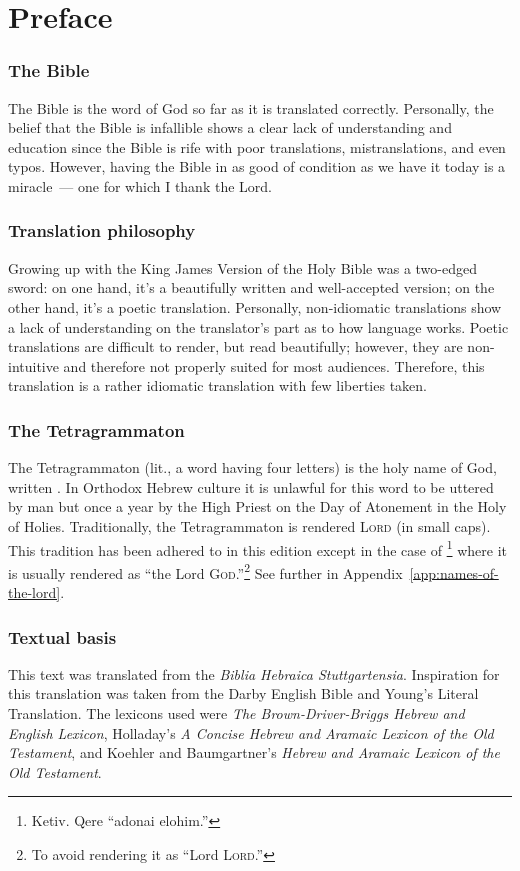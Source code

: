 \onecolumn
\chapter*{Preface}
\subsection*{The Bible}
The Bible is the word of God so far as it is translated correctly. Personally, the belief that the Bible is infallible shows a clear lack of understanding and education since the Bible is rife with poor translations, mistranslations, and even typos. However, having the Bible in as good of condition as we have it today is a miracle~--- one for which I thank the Lord.

\subsection*{Translation philosophy}
Growing up with the King James Version of the Holy Bible was a two-edged sword: on one hand, it's a beautifully written and well-accepted version; on the other hand, it's a poetic translation. Personally, non-idiomatic translations show a lack of understanding on the translator's part as to how language works. Poetic translations are difficult to render, but read beautifully; however, they are non-intuitive and therefore not properly suited for most audiences. Therefore, this translation is a rather idiomatic translation with few liberties taken.

\subsection*{The Tetragrammaton}
The Tetragrammaton (lit., a word having four letters) is the holy name of God, written . In Orthodox Hebrew culture it is unlawful for this word to be uttered by man but once a year by the High Priest on the Day of Atonement in the Holy of Holies. Traditionally, the Tetragrammaton is rendered \textsc{Lord} (in small caps). This tradition has been adhered to in this edition except in the case of \footnote{Ketiv. Qere ``adonai elohim.''} where it is usually rendered as ``the Lord \textsc{God}.''\footnote{To avoid rendering it as ``Lord \textsc{Lord}.''} See further in Appendix~\ref{app:names-of-the-lord}.

\subsection*{Textual basis}
This text was translated from the \emph{Biblia Hebraica Stuttgartensia}. Inspiration for this translation was taken from the Darby English Bible and Young's Literal Translation. The lexicons used were \emph{The Brown-Driver-Briggs Hebrew and English Lexicon}, Holladay's \emph{A Concise Hebrew and Aramaic Lexicon of the Old Testament}, and Koehler and Baumgartner's \emph{Hebrew and Aramaic Lexicon of the Old Testament}.

